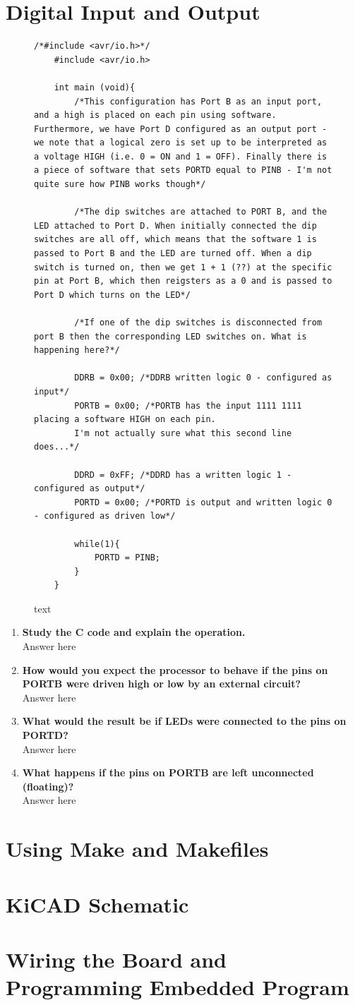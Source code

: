 \documentclass[a4paper]{article}
\begin{document}
\section{Digital Input and Output}

\begin{figure}[h]
	\begin{lstlisting}[style=CStyle]
	/*#include <avr/io.h>*/
	#include <avr/io.h>
	
	int main (void){
		/*This configuration has Port B as an input port, and a high is placed on each pin using software. Furthermore, we have Port D configured as an output port - we note that a logical zero is set up to be interpreted as a voltage HIGH (i.e. 0 = ON and 1 = OFF). Finally there is a piece of software that sets PORTD equal to PINB - I'm not quite sure how PINB works though*/
	
		/*The dip switches are attached to PORT B, and the LED attached to Port D. When initially connected the dip switches are all off, which means that the software 1 is passed to Port B and the LED are turned off. When a dip switch is turned on, then we get 1 + 1 (??) at the specific pin at Port B, which then reigsters as a 0 and is passed to Port D which turns on the LED*/
	
		/*If one of the dip switches is disconnected from port B then the corresponding LED switches on. What is happening here?*/
	
		DDRB = 0x00; /*DDRB written logic 0 - configured as input*/
		PORTB = 0x00; /*PORTB has the input 1111 1111 placing a software HIGH on each pin.
		I'm not actually sure what this second line does...*/
	
		DDRD = 0xFF; /*DDRD has a written logic 1 - configured as output*/
		PORTD = 0x00; /*PORTD is output and written logic 0 - configured as driven low*/
	
		while(1){
			PORTD = PINB;
		}
	}
	\end{lstlisting}
	\caption{text}
\end{figure}

\begin{enumerate}
	\item \textbf{Study the C code and explain the operation.}\\ Answer here
	\item \textbf{How would you expect the processor to behave if the pins on PORTB were driven high or low by an external circuit?}\\ Answer here
	\item \textbf{What would the result be if LEDs were connected to the pins on PORTD?}\\ Answer here
	\item \textbf{What happens if the pins on PORTB are left unconnected (floating)?}\\ Answer here
\end{enumerate}
\section{Using Make and Makefiles}

\section{KiCAD Schematic}

\section{Wiring the Board and Programming Embedded Program}
\end{document}
